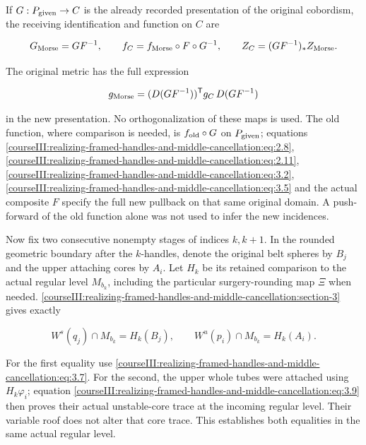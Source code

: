 If \(G:P_{\rm given}\to C\) is the already recorded presentation of the original cobordism, the receiving identification and function on \(C\) are

\begin{equation}
G_{\rm Morse}=GF^{-1},\qquad
 f_C=f_{\rm Morse}\circ F\circ G^{-1},\qquad
 Z_C=(GF^{-1})_*Z_{\rm Morse}.
 \label{courseIII:realizing-framed-handles-and-middle-cancellation:eq:4.4}
\end{equation}

The original metric has the full expression

\begin{equation}
g_{\rm Morse}=(D(GF^{-1}))^{\mathsf T}
                       g_C\,D(GF^{-1})
 \label{courseIII:realizing-framed-handles-and-middle-cancellation:eq:4.5}
\end{equation}

in the new presentation. No orthogonalization of these maps is used. The old function, where comparison is needed, is \(f_{\rm old}\circ G\) on \(P_{\rm given}\); equations \eqref{courseIII:realizing-framed-handles-and-middle-cancellation:eq:2.8}, \eqref{courseIII:realizing-framed-handles-and-middle-cancellation:eq:2.11}, \eqref{courseIII:realizing-framed-handles-and-middle-cancellation:eq:3.2}, \eqref{courseIII:realizing-framed-handles-and-middle-cancellation:eq:3.5} and the actual composite \(F\) specify the full new pullback on that same original domain. A push-forward of the old function alone was not used to infer the new incidences.

Now fix two consecutive nonempty stages of indices \(k,k+1\). In the rounded geometric boundary after the \(k\)-handles, denote the original belt spheres by \(B_j\) and the upper attaching cores by \(A_i\). Let \(H_k\) be its retained comparison to the actual regular level \(M_{b_k}\), including the particular surgery-rounding map \(\Xi\) when needed. \cref{courseIII:realizing-framed-handles-and-middle-cancellation:section-3} gives exactly

\begin{equation}
W^s(q_j)\cap M_{b_k}=H_k(B_j),\qquad
 W^u(p_i)\cap M_{b_k}=H_k(A_i).
 \label{courseIII:realizing-framed-handles-and-middle-cancellation:eq:4.6}
\end{equation}

For the first equality use \eqref{courseIII:realizing-framed-handles-and-middle-cancellation:eq:3.7}. For the second, the upper whole tubes were attached using \(H_k\varphi_i\); equation \eqref{courseIII:realizing-framed-handles-and-middle-cancellation:eq:3.9} then proves their actual unstable-core trace at the incoming regular level. Their variable roof does not alter that core trace. This establishes both equalities in the same actual regular level.

